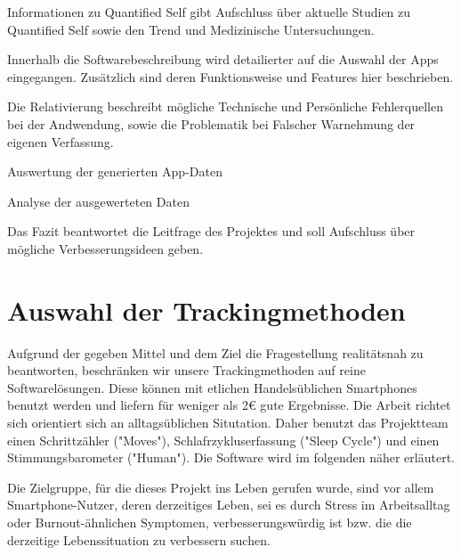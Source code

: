 Informationen zu Quantified Self gibt Aufschluss über aktuelle Studien
zu Quantified Self sowie den Trend und Medizinische Untersuchungen.

Innerhalb die Softwarebeschreibung wird detailierter auf die Auswahl der
Apps eingegangen. Zusätzlich sind deren Funktionsweise und Features hier
beschrieben.

Die Relativierung beschreibt mögliche Technische und Persönliche
Fehlerquellen bei der Andwendung, sowie die Problematik bei Falscher
Warnehmung der eigenen Verfassung.

Auswertung der generierten App-Daten

Analyse der ausgewerteten Daten

Das Fazit beantwortet die Leitfrage des Projektes und soll Aufschluss
über mögliche Verbesserungsideen geben.

\section{Auswahl der Trackingmethoden}
\label{ch:Einleitung:sec:auswahl-der-trackingmethoden}

Aufgrund der gegeben Mittel und dem Ziel die Fragestellung realitätsnah zu beantworten, beschränken wir unsere Trackingmethoden auf reine Softwarelösungen. Diese können mit etlichen Handelsüblichen Smartphones benutzt werden und liefern für weniger als 2\euro{} gute Ergebnisse. Die Arbeit richtet sich orientiert sich an alltagsüblichen Situtation. Daher benutzt das Projektteam einen Schrittzähler ("Moves"), Schlafrzykluserfassung ("Sleep Cycle") und einen Stimmungsbarometer ("Human").
Die Software wird im folgenden näher erläutert.

Die Zielgruppe, für die dieses Projekt ins Leben gerufen wurde, sind vor allem Smartphone-Nutzer, deren derzeitiges Leben, sei es durch Stress im Arbeitsalltag oder Burnout-ähnlichen Symptomen, verbesserungswürdig ist bzw. die die derzeitige Lebenssituation zu verbessern suchen.  

